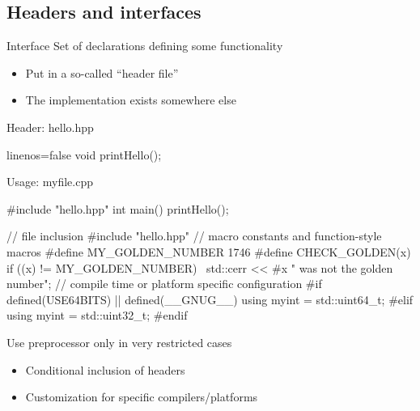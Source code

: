 \subsection[.h]{Headers and interfaces}

\begin{frame}[fragile]
  \begin{block}{Interface}
    Set of declarations defining some functionality
    \begin{itemize}
    \item Put in a so-called ``header file''
    \item The implementation exists somewhere else
    \end{itemize}
  \end{block}
  \begin{block}{Header: hello.hpp}
    \begin{cppcode*}{linenos=false}
      void printHello();
    \end{cppcode*}
  \end{block}
  \begin{block}{Usage: myfile.cpp}
    \begin{cppcode*}{}
      #include "hello.hpp"
      int main() {
        printHello();
      }
    \end{cppcode*}
  \end{block}
\end{frame}

\begin{frame}[fragile]
  \begin{cppcode}
    // file inclusion
    #include "hello.hpp"
    // macro constants and function-style macros
    #define MY_GOLDEN_NUMBER 1746
    #define CHECK_GOLDEN(x) if ((x) != MY_GOLDEN_NUMBER) \
      std::cerr << #x " was not the golden number\n";
    // compile time or platform specific configuration
    #if defined(USE64BITS) || defined(__GNUG__)
      using myint = std::uint64_t;
    #elif
      using myint = std::uint32_t;
    #endif
  \end{cppcode}
  \pause
  \begin{goodpractice}[preprocessor]{Use preprocessor only in very restricted cases}
    \begin{itemize}
      \item Conditional inclusion of headers
      \item Customization for specific compilers/platforms
    \end{itemize}
  \end{goodpractice}
\end{frame}

